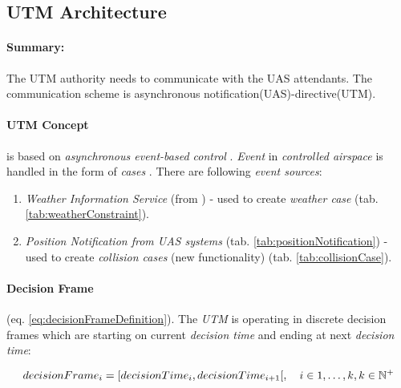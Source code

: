\newpage
\subsection{UTM Architecture}\label{sec:utmArchitecture}

\paragraph{Summary:} The UTM authority needs to communicate with the UAS attendants. The communication scheme is asynchronous notification(UAS)-directive(UTM). 

\paragraph{UTM Concept} is based on \emph{asynchronous event-based control} \cite{zimmer2011rule}. \emph{Event} in \emph{controlled airspace} is handled in the form of \emph{cases} \cite{prevot2016uas}. There are following \emph{event sources}:

\begin{enumerate}
    \item \emph{Weather Information Service} (from \cite{zimmer2014selective}) - used to create \emph{weather case} (tab. \ref{tab:weatherConstraint}).
    
    \item \emph{Position Notification from UAS systems} (tab. \ref{tab:positionNotification}) - used to create \emph{collision cases} (new functionality) (tab. \ref{tab:collisionCase}).
\end{enumerate}


\paragraph{Decision Frame} (eq. \ref{eq:decisionFrameDefinition}). The \emph{UTM} is operating in discrete decision frames which are starting on current \emph{decision time} and ending at  next \emph{decision  time}:

\begin{equation}\label{eq:decisionFrameDefinition}
    decision Frame_i = [decision Time_i, decision Time_{i+1}[,\quad i \in {1,\dots,k}, k \in \mathbb{N}^+
\end{equation}

